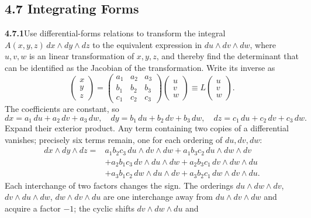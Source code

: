 \subsection*{4.7 Integrating Forms}

\par\bigskip
\noindent\textbf{4.7.1}\quad Use differential-forms relations to transform the
integral $A(x,y,z)\,dx\wedge dy\wedge dz$ to the equivalent expression in
$du\wedge dv\wedge dw$, where $u,v,w$ is an  linear transformation of $x,y,z$,
and thereby find the determinant that can be identified as the Jacobian of the
transformation.
\solution
{} Write its inverse as
\[
\begin{pmatrix}x\\y\\z\end{pmatrix}
=\begin{pmatrix}a_1&a_2&a_3\\b_1&b_2&b_3\\c_1&c_2&c_3\end{pmatrix}
 \begin{pmatrix}u\\v\\w\end{pmatrix}
\equiv L\begin{pmatrix}u\\v\\w\end{pmatrix}.
\]
The coefficients are constant, so
\[
dx=a_1\,du+a_2\,dv+a_3\,dw,\quad
dy=b_1\,du+b_2\,dv+b_3\,dw,\quad
dz=c_1\,du+c_2\,dv+c_3\,dw.
\]
Expand their exterior product. Any term containing two copies of a
differential vanishes; precisely six terms remain, one for each
ordering of $du,dv,dw$:
\begin{align*}
dx\wedge dy\wedge dz
={}&a_1b_2c_3\,du\wedge dv\wedge dw
 +a_1b_3c_2\,du\wedge dw\wedge dv\\
&+a_2b_1c_3\,dv\wedge du\wedge dw
 +a_2b_3c_1\,dv\wedge dw\wedge du\\
&+a_3b_1c_2\,dw\wedge du\wedge dv
 +a_3b_2c_1\,dw\wedge dv\wedge du.
\end{align*}
Each interchange of two factors changes the sign. The orderings
$du\wedge dw\wedge dv$, $dv\wedge du\wedge dw$, $dw\wedge dv\wedge du$
are one interchange away from $du\wedge dv\wedge dw$ and acquire a
factor $-1$; the cyclic shifts $dv\wedge dw\wedge du$ and
